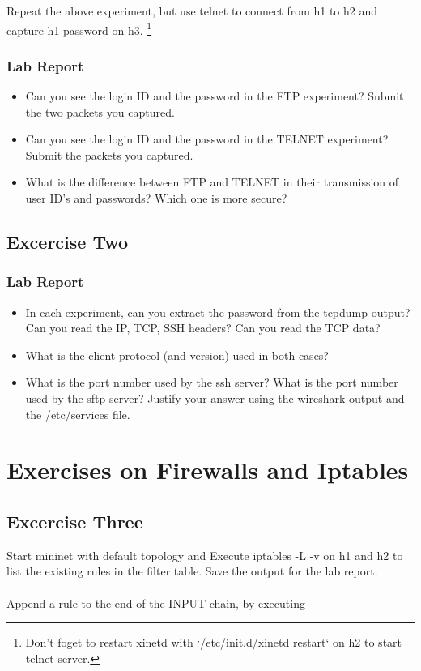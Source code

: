 \documentclass[10pt,a4paper]{article}
\numberwithin{equation}{section}
\numberwithin{figure}{section}
\numberwithin{table}{section}
\begin{document}
Repeat the above experiment, but use telnet to connect from h1 to h2 and capture h1 password on h3. \footnote{Don't foget to restart xinetd with `/etc/init.d/xinetd restart` on h2 to start telnet server. }

\subsubsection*{ Lab Report}
\begin{itemize}
	\setlength{\itemindent}{0pt}
	\item Can you see the login ID and the password in the FTP experiment? Submit the two packets you captured.
	\item Can you see the login ID and the password in the TELNET experiment? Submit the packets you captured.
	\item What is the difference between FTP and TELNET in their transmission of user ID’s and passwords? Which one is more secure?
\end{itemize}

\subsection{Excercise Two}


\subsubsection*{ Lab Report}
\begin{itemize}
	\setlength{\itemindent}{0pt}
	\item In each experiment, can you extract the password from the tcpdump output? Can you read the IP, TCP, SSH headers? Can you read the TCP data?
	\item What is the client protocol (and version) used in both cases?
	\item What is the port number used by the ssh server? What is the port number used by the sftp server? Justify your answer using the wireshark output and the /etc/services file.
\end{itemize}

    \pagebreak

\section{Exercises on Firewalls and Iptables}
\subsection*{Excercise Three}
Start mininet with default topology and Execute iptables -L -v on h1 and h2 to list the existing rules in the filter table. Save the output for the lab report.\\
\\
 Append a rule to the end of the INPUT chain, by executing
\end{document}
